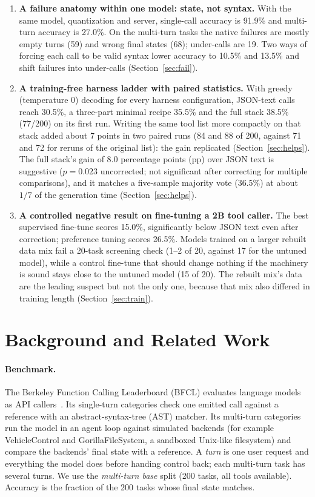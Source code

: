 \documentclass[11pt]{article}
\begin{document}
\begin{enumerate}
  \item \textbf{A failure anatomy within one model: state, not syntax.} With the same model, quantization and server, single-call accuracy is 91.9\% and multi-turn accuracy is 27.0\%. On the multi-turn tasks the native failures are mostly empty turns (59) and wrong final states (68); under-calls are 19. Two ways of forcing each call to be valid syntax lower accuracy to 10.5\% and 13.5\% and shift failures into under-calls (Section~\ref{sec:fail}).
  \item \textbf{A training-free harness ladder with paired statistics.} With greedy (temperature 0) decoding for every harness configuration, JSON-text calls reach 30.5\%, a three-part minimal recipe 35.5\% and the full stack 38.5\% (77/200) on its first run. Writing the same tool list more compactly on that stack added about 7 points in two paired runs (84 and 88 of 200, against 71 and 72 for reruns of the original list): the gain replicated (Section~\ref{sec:helps}). The full stack's gain of 8.0 percentage points (pp) over JSON text is suggestive ($p=0.023$ uncorrected; not significant after correcting for multiple comparisons), and it matches a five-sample majority vote (36.5\%) at about $1/7$ of the generation time (Section~\ref{sec:helps}).
  \item \textbf{A controlled negative result on fine-tuning a 2B tool caller.} The best supervised fine-tune scores 15.0\%, significantly below JSON text even after correction; preference tuning scores 26.5\%. Models trained on a larger rebuilt data mix fail a 20-task screening check (1--2 of 20, against 17 for the untuned model), while a control fine-tune that should change nothing if the machinery is sound stays close to the untuned model (15 of 20). The rebuilt mix's data are the leading suspect but not the only one, because that mix also differed in training length (Section~\ref{sec:train}).
\end{enumerate}

\section{Background and Related Work}
\label{sec:related}

\paragraph{Benchmark.} The Berkeley Function Calling Leaderboard (BFCL) evaluates language models as API callers~\cite{patil2023gorilla,patil2024bfcl}. Its single-turn categories check one emitted call against a reference with an abstract-syntax-tree (AST) matcher. Its multi-turn categories run the model in an agent loop against simulated backends (for example VehicleControl and GorillaFileSystem, a sandboxed Unix-like filesystem) and compare the backends' final state with a reference. A \emph{turn} is one user request and everything the model does before handing control back; each multi-turn task has several turns. We use the \emph{multi-turn base} split (200 tasks, all tools available). Accuracy is the fraction of the 200 tasks whose final state matches.
\end{document}
